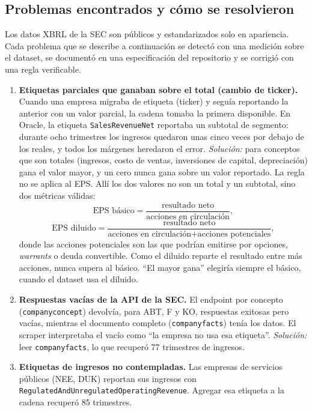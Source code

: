\documentclass[12pt,letterpaper,oneside]{report}
\renewcommand{\_}{\UnderscoreOriginal\allowbreak}
\begin{document}
\subsection{Problemas encontrados y cómo se resolvieron}
\label{sec:problemas-scraper}

Los datos XBRL de la SEC son públicos y estandarizados solo en apariencia. Cada problema que se describe a continuación se detectó con una medición sobre el dataset, se documentó en una especificación del repositorio y se corrigió con una regla verificable.

\begin{enumerate}
  \item \textbf{Etiquetas parciales que ganaban sobre el total (cambio de ticker).} Cuando una empresa migraba de etiqueta (ticker) y seguía reportando la anterior con un valor parcial, la cadena tomaba la primera disponible. En Oracle, la etiqueta \texttt{SalesRevenueNet} reportaba un subtotal de segmento: durante ocho trimestres los ingresos quedaron unas cinco veces por debajo de los reales, y todos los márgenes heredaron el error. \emph{Solución:} para conceptos que son totales (ingresos, costo de ventas, inversiones de capital, depreciación) gana el valor mayor, y un cero nunca gana sobre un valor reportado. La regla no se aplica al EPS. Allí los dos valores no son un total y un subtotal, sino dos métricas válidas:
  \[
  \mbox{EPS básico} = \frac{\mbox{resultado neto}}{\mbox{acciones en circulación}},
  \]
  \[
  \mbox{EPS diluido} = \frac{\mbox{resultado neto}}{\mbox{acciones en circulación} + \mbox{acciones potenciales}},
  \]
  donde las acciones potenciales son las que podrían emitirse por opciones, \textit{warrants} o deuda convertible. Como el diluido reparte el resultado entre más acciones, nunca supera al básico. ``El mayor gana'' elegiría siempre el básico, cuando el dataset usa el diluido.
  \item \textbf{Respuestas vacías de la API de la SEC.} El endpoint por concepto (\texttt{companyconcept}) devolvía, para ABT, F y KO, respuestas exitosas pero vacías, mientras el documento completo (\texttt{companyfacts}) tenía los datos. El scraper interpretaba el vacío como ``la empresa no usa esa etiqueta''. \emph{Solución:} leer \texttt{companyfacts}, lo que recuperó 77 trimestres de ingresos.
  \item \textbf{Etiquetas de ingresos no contempladas.} Las empresas de servicios públicos (NEE, DUK) reportan sus ingresos con \texttt{RegulatedAndUnregulatedOperatingRevenue}. Agregar esa etiqueta a la cadena recuperó 85 trimestres.

\end{enumerate}
\end{document}

